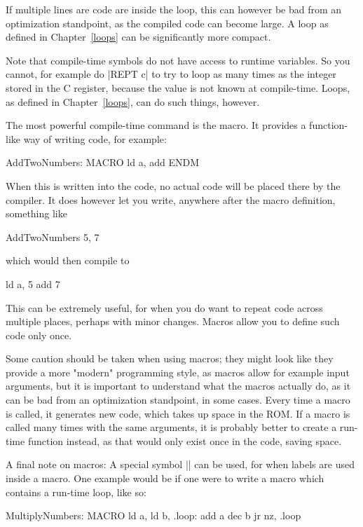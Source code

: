\documentclass[11pt]{book}
\begin{document}
If multiple lines are code are inside the loop, this can however be bad from an optimization standpoint, as the compiled code can become large. A loop as defined in Chapter~\ref{loops} can be significantly more compact.

Note that compile-time symbols do not have access to runtime variables. So you cannot, for example do |REPT c| to try to loop as many times as the integer stored in the C register, because the value is not known at compile-time. Loops, as defined in Chapter~\ref{loops}, can do such things, however.

The most powerful compile-time command is the macro. It provides a function-like way of writing code, for example:

\begin{code}
AddTwoNumbers: MACRO
    ld a, \1
    add \2
ENDM
\end{code}

When this is written into the code, no actual code will be placed there by the compiler. It does however let you write, anywhere after the macro definition, something like

\begin{code}
AddTwoNumbers 5, 7
\end{code}

which would then compile to 

\begin{code}
ld a, 5
add 7
\end{code}

This can be extremely useful, for when you do want to repeat code across multiple places, perhaps with minor changes. Macros allow you to define such code only once. 

Some caution should be taken when using macros; they might look like they provide a more "modern" programming style, as macros allow for example input arguments, but it is important to understand what the macros actually do, as it can be bad from an optimization standpoint, in some cases. Every time a macro is called, it generates new code, which takes up space in the ROM. If a macro is called many times with the same arguments, it is probably better to create a run-time function instead, as that would only exist once in the code, saving space.

A final note on macros: A special symbol |\@| can be used, for when labels are used inside a macro. One example would be if one were to write a macro which contains a run-time loop, like so:

\begin{code}
MultiplyNumbers: MACRO
    ld a, \1
    ld b, \2
.loop\@:
    add a
    dec b
    jr nz, .loop\@
\end{code}
\end{document}
